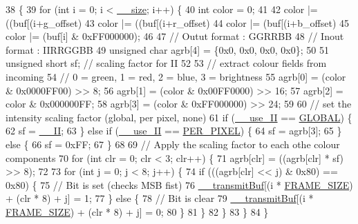 \begin{DoxyCode}
38                                                                          \{
39     \textcolor{keywordflow}{for} (\textcolor{keywordtype}{int} i = 0; i < \hyperlink{class_w_s2812_a5623ee0fd628d54483c0427f30f4d568}{\_\_size}; i++) \{
40         \textcolor{keywordtype}{int} color = 0;
41 
42         color |= ((buf[(i+g\_offset)%
43         color |= ((buf[(i+r\_offset)%
44         color |=  (buf[(i+b\_offset)%
45         color |= (buf[i] & 0xFF000000);
46 
47         \textcolor{comment}{// Outut format : GGRRBB}
48         \textcolor{comment}{// Inout format : IIRRGGBB}
49         \textcolor{keywordtype}{unsigned} \textcolor{keywordtype}{char} agrb[4] = \{0x0, 0x0, 0x0, 0x0\};
50 
51         \textcolor{keywordtype}{unsigned} \textcolor{keywordtype}{short} sf; \textcolor{comment}{// scaling factor for  II}
52 
53         \textcolor{comment}{// extract colour fields from incoming}
54         \textcolor{comment}{// 0 = green, 1 = red, 2 = blue, 3 = brightness}
55         agrb[0] = (color & 0x0000FF00) >> 8;
56         agrb[1] = (color & 0x00FF0000) >> 16;
57         agrb[2] = color  & 0x000000FF;
58         agrb[3] = (color & 0xFF000000) >> 24;
59 
60         \textcolor{comment}{// set the intensity scaling factor (global, per pixel, none)}
61         \textcolor{keywordflow}{if} (\hyperlink{class_w_s2812_a249d1039add9ef099574fc4a52aa1235}{\_\_use\_II} == \hyperlink{class_w_s2812_a14186f70863bf4f3a35b2cc21b15642daa7deeb0d0cec915ba197b48ca887ed45}{GLOBAL}) \{
62             sf = \hyperlink{class_w_s2812_a90cb6ef1c50bfa6b2d1a7e6100adead7}{\_\_II};
63         \} \textcolor{keywordflow}{else} \textcolor{keywordflow}{if} (\hyperlink{class_w_s2812_a249d1039add9ef099574fc4a52aa1235}{\_\_use\_II} == \hyperlink{class_w_s2812_a14186f70863bf4f3a35b2cc21b15642dad5ae572eb876f9e90650fd6817385863}{PER\_PIXEL}) \{
64             sf = agrb[3];
65         \} \textcolor{keywordflow}{else} \{
66             sf = 0xFF;
67         \}
68 
69         \textcolor{comment}{// Apply the scaling factor to each othe colour components}
70         \textcolor{keywordflow}{for} (\textcolor{keywordtype}{int} clr = 0; clr < 3; clr++) \{
71             agrb[clr] = ((agrb[clr] * sf) >> 8);
72 
73             \textcolor{keywordflow}{for} (\textcolor{keywordtype}{int} j = 0; j < 8; j++) \{
74                 \textcolor{keywordflow}{if} (((agrb[clr] << j) & 0x80) == 0x80) \{
75                     \textcolor{comment}{// Bit is set (checks MSB fist)}
76                     \hyperlink{class_w_s2812_a345b0895fb037ed603a79806bb7e510c}{\_\_transmitBuf}[(i * \hyperlink{_w_s2812_8h_af9b1b2ba12857a4bf11289dac8c5462d}{FRAME\_SIZE}) + (clr * 8) + j] = 1;
77                 \} \textcolor{keywordflow}{else} \{
78                     \textcolor{comment}{// Bit is clear}
79                     \hyperlink{class_w_s2812_a345b0895fb037ed603a79806bb7e510c}{\_\_transmitBuf}[(i * \hyperlink{_w_s2812_8h_af9b1b2ba12857a4bf11289dac8c5462d}{FRAME\_SIZE}) + (clr * 8) + j] = 0;
80                 \}
81             \}
82         \}
83     \}
84 \}
\end{DoxyCode}
